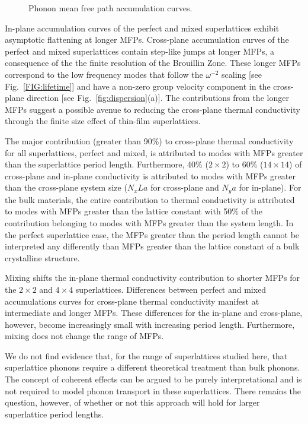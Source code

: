 \documentclass[aps,prb,preprint,preprintnumbers,amsmath,amssymb,floatfix,superscriptaddress]{revtex4}
\begin{document}
\begin{figure}%
\begin{center}
\renewcommand{\figure}{Fig.}
\caption{Phonon mean free path accumulation curves.}
\label{FIG:MFP_cuml}
\end{center}
\end{figure}
In-plane accumulation curves of the perfect and mixed superlattices exhibit asymptotic flattening at longer MFPs. Cross-plane accumulation curves of the perfect and mixed superlattices contain step-like jumps at longer MFPs, a consequence of the the finite resolution of the Brouillin Zone.\cite{esfarjani2011heat} These longer MFPs correspond to the low frequency modes that follow the $\omega^{-2}$ scaling [see Fig.~\ref{FIG:lifetime}] and have a non-zero group velocity component in the cross-plane direction [see Fig.~\ref{fig:dispersion}(a)]. The contributions from the longer MFPs suggest a possible avenue to reducing the cross-plane thermal conductivity through the finite size effect of thin-film superlattices.\cite{Luckyanova16112012} 

The major contribution (greater than 90\%) to cross-plane thermal conductivity for all superlattices, perfect and mixed, is attributed to modes with MFPs greater than the superlattice period length. Furthermore, 40\% ($2 \times 2 $) to 60\% ($14 \times 14$) of cross-plane and in-plane conductivity is attributed to modes with MFPs greater than the cross-plane system size ($N_xLa$ for cross-plane and $N_ya$ for in-plane). For the bulk materials, the entire contribution to thermal conductivity is attributed to modes with MFPs greater than the lattice constant with 50\% of the contribution belonging to modes with MFPs greater than the system length. In the perfect superlattice case, the MFPs greater than the period length cannot be interpreted any differently than MFPs greater than the lattice constant of a bulk crystalline structure.

Mixing shifts the in-plane thermal conductivity contribution to shorter MFPs for the $2 \times 2 $ and $4 \times 4 $ superlattices. Differences between perfect and mixed accumulations curves for cross-plane thermal conductivity manifest at intermediate and longer MFPs. These differences for the in-plane and cross-plane, however, become increasingly small with increasing period length. Furthermore, mixing does not change the range of MFPs. 

We do not find evidence that, for the range of superlattices studied here, that superlattice phonons require a different theoretical treatment than bulk phonons. The concept of coherent effects can be argued to be purely interpretational and is not required to model phonon transport in these superlattices. There remains the question, however, of whether or not this approach will hold for larger superlattice period lengths.
\end{document}
